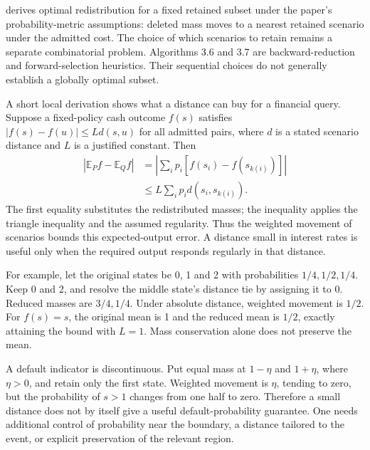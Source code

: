 \citet[Section 3, Theorem 3.1 and its proof]{dupacova2000preprint} derives optimal redistribution for a fixed retained subset under the paper's probability-metric assumptions: deleted mass moves to a nearest retained scenario under the admitted cost. The choice of which scenarios to retain remains a separate combinatorial problem. Algorithms 3.6 and 3.7 are backward-reduction and forward-selection heuristics. Their sequential choices do not generally establish a globally optimal subset.

A short local derivation shows what a distance can buy for a financial query. Suppose a fixed-policy cash outcome $f(s)$ satisfies $|f(s)-f(u)|\leq Ld(s,u)$ for all admitted pairs, where $d$ is a stated scenario distance and $L$ is a justified constant. Then
\begin{align}
 |\mathbb E_P f-\mathbb E_Q f|
 &=\left|\sum_i p_i[f(s_i)-f(s_{k(i)})]\right|\nonumber\\
 &\leq L\sum_i p_i d(s_i,s_{k(i)}).
\end{align}
The first equality substitutes the redistributed masses; the inequality applies the triangle inequality and the assumed regularity. Thus the weighted movement of scenarios bounds this expected-output error. A distance small in interest rates is useful only when the required output responds regularly in that distance.

For example, let the original states be 0, 1 and 2 with probabilities $1/4,1/2,1/4$. Keep 0 and 2, and resolve the middle state's distance tie by assigning it to 0. Reduced masses are $3/4,1/4$. Under absolute distance, weighted movement is $1/2$. For $f(s)=s$, the original mean is 1 and the reduced mean is $1/2$, exactly attaining the bound with $L=1$. Mass conservation alone does not preserve the mean.

A default indicator is discontinuous. Put equal mass at $1-\eta$ and $1+\eta$, where $\eta>0$, and retain only the first state. Weighted movement is $\eta$, tending to zero, but the probability of $s>1$ changes from one half to zero. Therefore a small distance does not by itself give a useful default-probability guarantee. One needs additional control of probability near the boundary, a distance tailored to the event, or explicit preservation of the relevant region.



